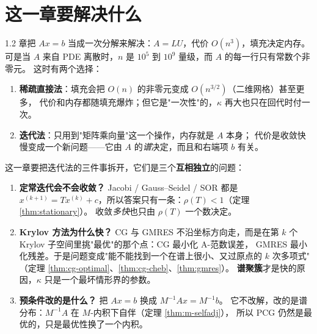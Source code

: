 

\section{这一章要解决什么}

1.2 章把 $Ax=b$ 当成一次分解来解决：$A=LU$，代价 $O(n^3)$，填充决定内存。
可是当 $A$ 来自 PDE 离散时，$n$ 是 $10^5$ 到 $10^9$ 量级，而 $A$ 的每一行只有常数个非零元。
这时有两个选择：

\begin{enumerate}
  \item \textbf{稀疏直接法}：填充会把 $O(n)$ 的非零元变成 $O(n^{3/2})$（二维网格）甚至更多，
        代价和内存都随填充爆炸；但它是"一次性"的，$\kappa$ 再大也只在回代时付一次。
  \item \textbf{迭代法}：只用到"矩阵乘向量"这一个操作，内存就是 $A$ 本身；
        代价是收敛快慢变成一个新问题——它由 $A$ 的\emph{谱}决定，而且和右端项 $b$ 有关。
\end{enumerate}

这一章要把迭代法的三件事拆开，它们是三个\textbf{互相独立}的问题：

\begin{enumerate}
  \item \textbf{定常迭代会不会收敛？} Jacobi / Gauss--Seidel / SOR 都是
        $x^{(k+1)}=Tx^{(k)}+c$，所以答案只有一条：$\rho(T)<1$（定理 \ref{thm:stationary}）。
        收敛\emph{多快}也只由 $\rho(T)$ 一个数决定。
  \item \textbf{Krylov 方法为什么快？} CG 与 GMRES 不沿坐标方向走，而是在第 $k$ 个
        Krylov 子空间里挑"最优"的那个点：CG 最小化 A-范数误差，
        GMRES 最小化残差。于是问题变成"能不能找到一个在谱上很小、又过原点的 $k$ 次多项式"
        （定理 \ref{thm:cg-optimal}、\ref{thm:cg-cheb}、\ref{thm:gmres}）。
        \textbf{谱聚簇}才是快的原因，$\kappa$ 只是一个最坏情形界的参数。
  \item \textbf{预条件改的是什么？} 把 $Ax=b$ 换成 $M^{-1}Ax=M^{-1}b$。
        它不改解，改的是谱分布：$M^{-1}A$ 在 $M$-内积下自伴（定理 \ref{thm:m-selfadj}），
        所以 PCG 仍然是最优的，只是最优性换了一个内积。
\end{enumerate}

